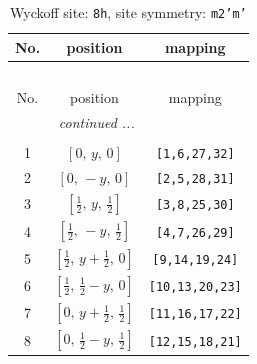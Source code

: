 \documentclass[fleqn,8pt]{jsarticle}
\begin{document}
\begin{longtable}{ccc}
\caption{Wyckoff site: {\tt 8h}, site symmetry: {\tt m2'm'}}
 \\
 \hline \hline
No. & position & mapping \\ \hline \endfirsthead

\multicolumn{2}{l}{\tablename\ \thetable{}} \\
 \hline \hline
No. & position & mapping \\ \hline \endhead

 \hline \hline
\multicolumn{2}{r}{\footnotesize\it continued ...} \\ \endfoot

 \hline \hline
\multicolumn{2}{r}{} \\ \endlastfoot

1 & $\left[ 0,\, y,\, 0 \right]$ & {\tt [1,6,27,32]} \\ \hline
2 & $\left[ 0,\, - y,\, 0 \right]$ & {\tt [2,5,28,31]} \\ \hline
3 & $\left[ \frac{1}{2},\, y,\, \frac{1}{2} \right]$ & {\tt [3,8,25,30]} \\ \hline
4 & $\left[ \frac{1}{2},\, - y,\, \frac{1}{2} \right]$ & {\tt [4,7,26,29]} \\ \hline
5 & $\left[ \frac{1}{2},\, y + \frac{1}{2},\, 0 \right]$ & {\tt [9,14,19,24]} \\ \hline
6 & $\left[ \frac{1}{2},\, \frac{1}{2} - y,\, 0 \right]$ & {\tt [10,13,20,23]} \\ \hline
7 & $\left[ 0,\, y + \frac{1}{2},\, \frac{1}{2} \right]$ & {\tt [11,16,17,22]} \\ \hline
8 & $\left[ 0,\, \frac{1}{2} - y,\, \frac{1}{2} \right]$ & {\tt [12,15,18,21]} \\
\end{longtable}
\renewcommand{\arraystretch}{1.2}
\end{document}
